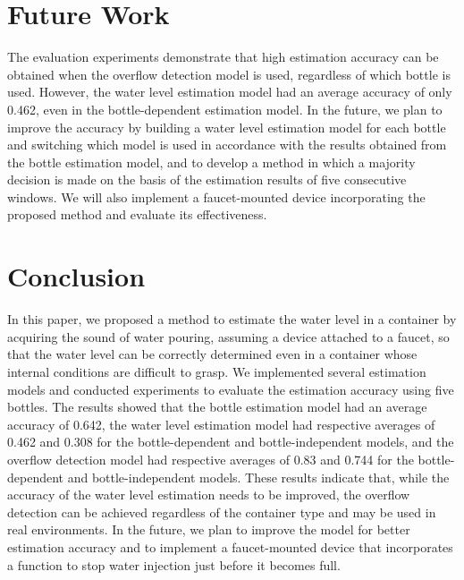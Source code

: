 \documentclass[manuscript,screen,review]{acmart}
\begin{document}
\section{Future Work}
\label{sec:future_work}
The evaluation experiments demonstrate that high estimation accuracy can be obtained when the overflow detection model is used, regardless of which bottle is used. However, the water level estimation model had an average accuracy of only 0.462, even in the bottle-dependent estimation model. In the future, we plan to improve the accuracy by building a water level estimation model for each bottle and switching which model is used in accordance with the results obtained from the bottle estimation model, and to develop a method in which a majority decision is made on the basis of the estimation results of five consecutive windows. We will also implement a faucet-mounted device incorporating the proposed method and evaluate its effectiveness.



\section{Conclusion}
\label{sec:conclution}
In this paper, we proposed a method to estimate the water level in a container by acquiring the sound of water pouring, assuming a device attached to a faucet, so that the water level can be correctly determined even in a container whose internal conditions are difficult to grasp. We implemented several estimation models and conducted experiments to evaluate the estimation accuracy using five bottles. The results showed that the bottle estimation model had an average accuracy of 0.642, the water level estimation model had respective averages of 0.462 and 0.308 for the bottle-dependent and bottle-independent models, and the overflow detection model had respective averages of 0.83 and 0.744 for the bottle-dependent and bottle-independent models. These results indicate that, while the accuracy of the water level estimation needs to be improved, the overflow detection can be achieved regardless of the container type and may be used in real environments. In the future, we plan to improve the model for better estimation accuracy and to implement a faucet-mounted device that incorporates a function to stop water injection just before it becomes full.

\end{document}
